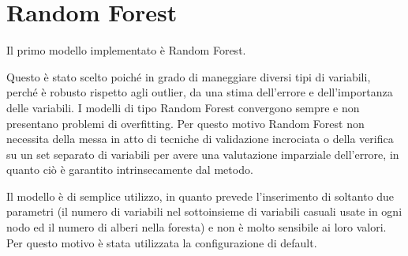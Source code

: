 \section{Random Forest}
Il primo modello implementato è Random Forest.

Questo è stato scelto poiché in grado di maneggiare diversi tipi di variabili, 
perché è robusto rispetto agli outlier, da una stima dell'errore e 
dell'importanza delle variabili. 
I modelli di tipo Random Forest convergono sempre e non presentano problemi di 
overfitting. Per questo motivo Random Forest non necessita della messa in atto 
di tecniche di validazione incrociata o della verifica su un set separato di 
variabili per avere una valutazione imparziale dell'errore, in quanto ciò è 
garantito intrinsecamente dal metodo.

Il modello è di semplice utilizzo, in quanto prevede l’inserimento di soltanto 
due parametri (il numero di variabili nel sottoinsieme di variabili casuali 
usate in ogni nodo ed il numero di alberi nella foresta) e non è molto 
sensibile ai loro valori. Per questo motivo è stata utilizzata la 
configurazione di default.

